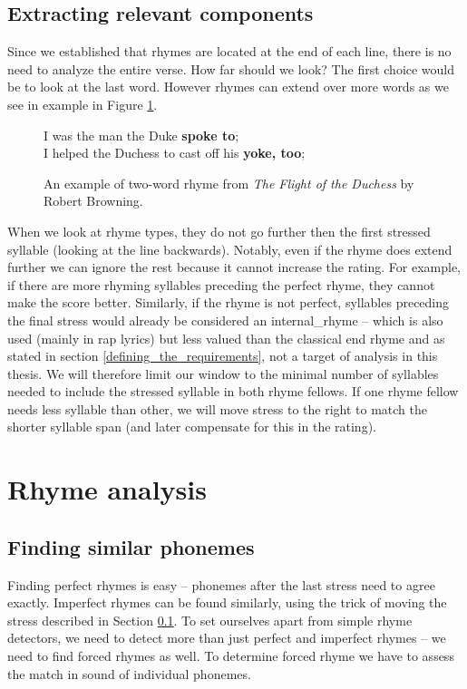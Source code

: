 \subsection{Extracting relevant components}\label{extracting_relevant_phonemes}
Since we established that rhymes are located at the end of each line, there is no need to analyze the entire verse. How far should we look? The first choice would be to look at the last word. However rhymes can extend over more words as we see in example in Figure \ref{two-word_rhyme}.
\begin{figure}[htb]\centering
	I was the man the Duke \textbf{spoke to};\\
	I helped the Duchess to cast off his \textbf{yoke, too};\\
	\caption{An example of two-word rhyme from \textit{The Flight of the Duchess} by Robert Browning.} 
	\label{two-word_rhyme}
\end{figure} 

When we look at rhyme types, they do not go further then the first stressed syllable (looking at the line backwards). Notably, even if the rhyme does extend further we can ignore the rest because it cannot increase the rating. For example, if there are more rhyming syllables preceding the perfect rhyme, they cannot make the score better. Similarly, if the rhyme is not perfect, syllables preceding the final stress would already be considered an \gls{internal_rhyme} -- which is also used (mainly in rap lyrics) but less valued than the classical end rhyme and as stated in section \ref{defining_the_requirements}, not a target of analysis in this thesis. We will therefore limit our window to the minimal number of syllables needed to include the stressed syllable in both rhyme fellows. If one rhyme fellow needs less syllable than other, we will move stress to the right to match the shorter syllable span (and later compensate for this in the rating).

\section{Rhyme analysis}
\subsection{Finding similar phonemes}
Finding perfect rhymes is easy -- phonemes after the last stress need to agree exactly. Imperfect rhymes can be found similarly, using the trick of moving the stress described in Section \ref{extracting_relevant_phonemes}.
To set ourselves apart from simple rhyme detectors, we need to detect more than just perfect and imperfect rhymes -- we need to find forced rhymes as well. To determine forced rhyme we have to assess the match in sound of individual phonemes.

